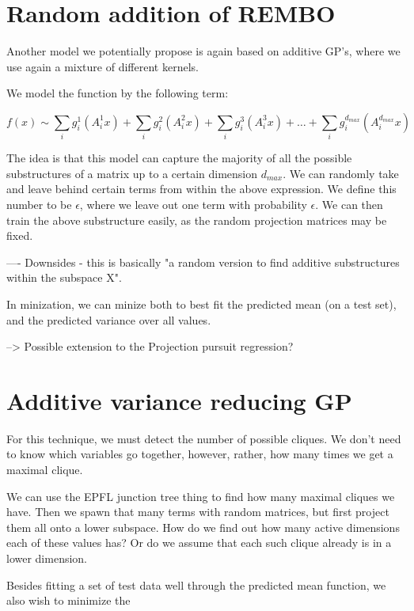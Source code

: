 \section{Random addition of REMBO}
Another model we potentially propose is again based on additive GP's, where we use again a mixture of different kernels.

We model the function by the following term:


\begin{equation}
f(x) \sim \sum_i g_i^1(A_i^1 x) + \sum_i g_i^2(A_i^2 x) + \sum_i g_i^3(A_i^3 x) + \ldots + \sum_i g_i^{d_{max}}(A_i^{d_{max}} x)
\end{equation}

The idea is that this model can capture the majority of all the possible substructures of a matrix up to a certain dimension $d_{max}$.
We can randomly take and leave behind certain terms from within the above expression.
We define this number to be $\epsilon$, where we leave out one term with probability $\epsilon$.
We can then train the above substructure easily, as the random projection matrices may be fixed.

----
Downsides - this is basically "a random version to find additive substructures within the subspace X".

In minization, we can minize both to best fit the predicted mean (on a test set), and the predicted variance over all values.

--> Possible extension to the Projection pursuit regression?

\section{Additive variance reducing GP}
For this technique, we must detect the number of possible cliques.
We don't need to know which variables go together, however, rather, how many times we get a maximal clique.

We can use the EPFL junction tree thing to find how many maximal cliques we have. 
Then we spawn that many terms with random matrices, but first project them all onto a lower subspace.
How do we find out how many active dimensions each of these values has?
Or do we assume that each such clique already is in a lower dimension.


Besides fitting a set of test data well through the predicted mean function, we also wish to minimize the 

